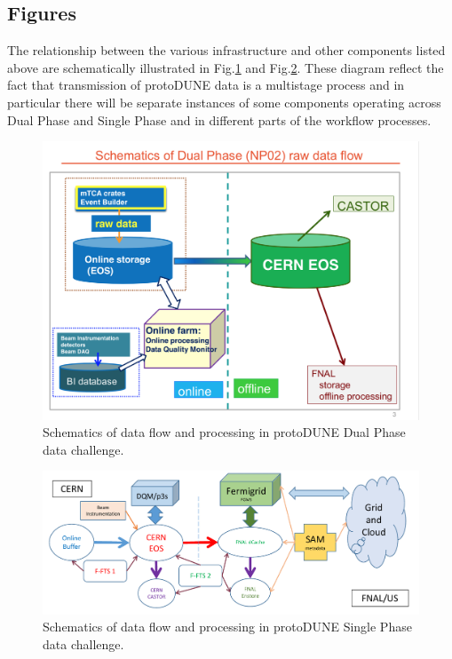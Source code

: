 \documentclass[pdftex,12pt,letter]{article}
\newcommand{\pd}{protoDUNE\xspace}
\newcommand{\singp}{Single Phase\xspace}
\newcommand{\dualp}{Dual Phase\xspace}
\begin{document}
\subsection{Figures}
\noindent The relationship between the various infrastructure and other components listed above are schematically illustrated in
Fig.\ref{fig:dc2dp} and Fig.\ref{fig:dc1}. These diagram reflect the fact that transmission of \pd data is a multistage process and in particular there 
will be separate instances of some components operating across \dualp and \singp and in different  parts of the workflow processes. 
\begin{figure}[tbh]
  \centering
  \includegraphics[width=1.0\textwidth]{../figures/DualPhaseDataFlow.png}
  \caption{Schematics of data flow and  processing in \pd \dualp data challenge.}
  \label{fig:dc2dp}
\end{figure}


\begin{figure}[tbh]
  \centering
  \includegraphics[width=1.0\textwidth]{../figures/data_challenge_1.pdf}
  \caption{Schematics of data flow and  processing in \pd \singp data challenge.}
  \label{fig:dc1}
\end{figure}
\end{document}
